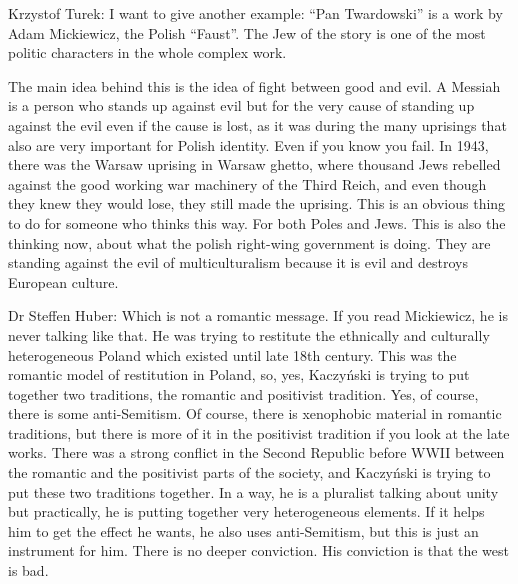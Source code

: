 Krzystof Turek: I want to give another example: “Pan Twardowski” is a work by Adam Mickiewicz, the Polish “Faust”. The Jew of the story is one of the most politic characters in the whole complex work. 

The main idea behind this is the idea of fight between good and evil. A Messiah is a person who stands up against evil but for the very cause of standing up against the evil even if the cause is lost, as it was during the many uprisings that also are very important for Polish identity. Even if you know you fail. In 1943, there was the Warsaw uprising in Warsaw ghetto, where thousand Jews rebelled against the good working war machinery of the Third Reich, and even though they knew they would lose, they still made the uprising. This is an obvious thing to do for someone who thinks this way. For both Poles and Jews. This is also the thinking now, about what the polish right-wing government is doing. They are standing against the evil of multiculturalism because it is evil and destroys European culture. 

Dr Steffen Huber: Which is not a romantic message. If you read Mickiewicz, he is never talking like that. He was trying to restitute the ethnically and culturally heterogeneous Poland which existed until late 18th century. This was the romantic model of restitution in Poland, so, yes, Kaczyński is trying to put together two traditions, the romantic and positivist tradition. Yes, of course, there is some anti-Semitism. Of course, there is xenophobic material in romantic traditions, but there is more of it in the positivist tradition if you look at the late works. There was a strong conflict in the Second Republic before WWII between the romantic and the positivist parts of the society, and Kaczyński is trying to put these two traditions together. In a way, he is a pluralist talking about unity but practically, he is putting together very heterogeneous elements. If it helps him to get the effect he wants, he also uses anti-Semitism, but this is just an instrument for him. There is no deeper conviction. His conviction is that the west is bad. 

 